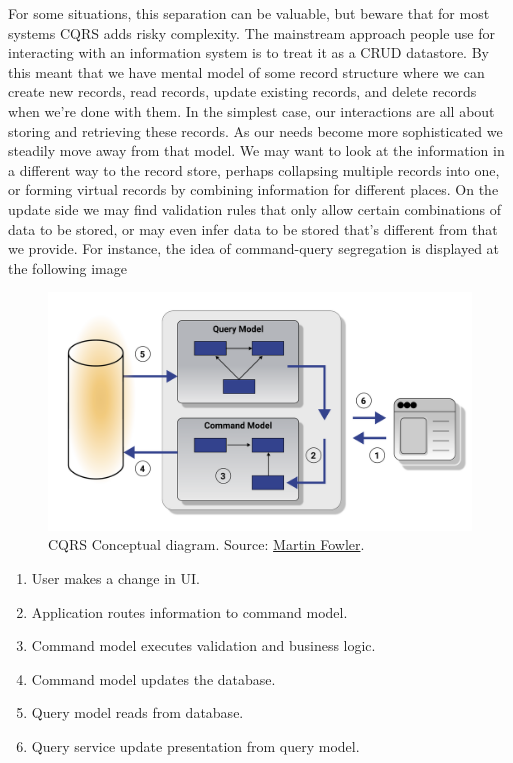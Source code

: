 For some situations, this separation can be valuable, but beware that for most systems CQRS adds risky complexity.
The mainstream approach people use for interacting with an information system is to treat it as a CRUD datastore.
By this meant that we have mental model of some record structure where we can create new records, read records,
update existing records, and delete records when we're done with them.
In the simplest case, our interactions are all about storing and retrieving these records.
As our needs become more sophisticated we steadily move away from that model.
We may want to look at the information in a different way to the record store, perhaps collapsing multiple records into one,
or forming virtual records by combining information for different places.
On the update side we may find validation rules that only allow certain combinations of data to be stored, or may even infer
data to be stored that's different from that we provide.
For instance, the idea of command-query segregation is displayed at the following image

\begin{figure}[H]
    \centering
    \includegraphics[width=1\textwidth]{Pictures/cqrs.pdf}
    \caption{CQRS Conceptual diagram.
    Source: \href{https://martinfowler.com/bliki/CQRS.html}{Martin Fowler}.}
    \label{fig:figure}
\end{figure}

\begin{enumerate}
    \item User makes a change in UI\@.
    \item Application routes information to command model.
    \item Command model executes validation and business logic.
    \item Command model updates the database.
    \item Query model reads from database.
    \item Query service update presentation from query model.
\end{enumerate}

